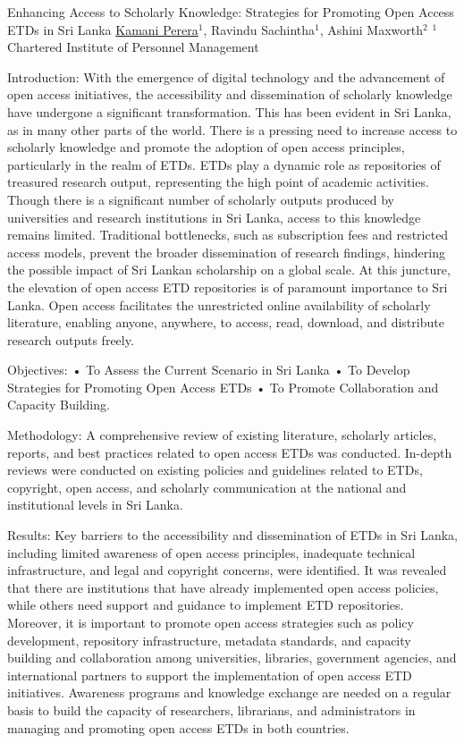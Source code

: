 \begin{abstract_online}{Enhancing Access to Scholarly Knowledge: Strategies for Promoting Open Access ETDs in Sri Lanka}{%
        \underline{Kamani Perera}$^{1}$, Ravindu Sachintha$^{1}$, Ashini Maxworth$^{2}$}{%
        }{
        $^1$ Chartered Institute of Personnel Management}{%
         }

    Introduction: With the emergence of digital technology and the advancement of open access initiatives, the accessibility and dissemination of scholarly knowledge have undergone a significant transformation. This has been evident in Sri Lanka, as in many other parts of the world. There is a pressing need to increase access to scholarly knowledge and promote the adoption of open access principles, particularly in the realm of ETDs. ETDs play a dynamic role as repositories of treasured research output, representing the high point of academic activities. Though there is a significant number of scholarly outputs produced by universities and research institutions in Sri Lanka, access to this knowledge remains limited. Traditional bottlenecks, such as subscription fees and restricted access models, prevent the broader dissemination of research findings, hindering the possible impact of Sri Lankan scholarship on a global scale. At this juncture, the elevation of open access ETD repositories is of paramount importance to Sri Lanka. Open access facilitates the unrestricted online availability of scholarly literature, enabling anyone, anywhere, to access, read, download, and distribute research outputs freely. 

    Objectives: • To Assess the Current Scenario in Sri Lanka • To Develop Strategies for Promoting Open Access ETDs • To Promote Collaboration and Capacity Building.
       
    Methodology: A comprehensive review of existing literature, scholarly articles, reports, and best practices related to open access ETDs was conducted. In-depth reviews were conducted on existing policies and guidelines related to ETDs, copyright, open access, and scholarly communication at the national and institutional levels in Sri Lanka. 

    Results: Key barriers to the accessibility and dissemination of ETDs in Sri Lanka, including limited awareness of open access principles, inadequate technical infrastructure, and legal and copyright concerns, were identified. It was revealed that there are institutions that have already implemented open access policies, while others need support and guidance to implement ETD repositories. Moreover, it is important to promote open access strategies such as policy development, repository infrastructure, metadata standards, and capacity building and collaboration among universities, libraries, government agencies, and international partners to support the implementation of open access ETD initiatives. Awareness programs and knowledge exchange are needed on a regular basis to build the capacity of researchers, librarians, and administrators in managing and promoting open access ETDs in both countries.
      

\end{abstract_online}
